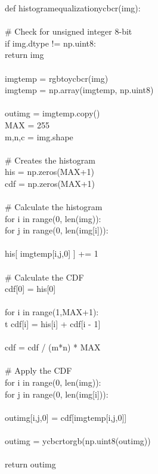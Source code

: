 \documentclass{article}
\begin{document}
	\noindent def histogram\textunderscore equalization\textunderscore ycbcr(img):\\
	\\
	\indent \# Check for unsigned integer 8-bit\\
	\indent if img.dtype != np.uint8:\\
	\indent \indent return img\\
	\\
	\indent img\textunderscore temp = rgb\textunderscore to\textunderscore ycbcr(img)\\
	\indent img\textunderscore temp = np.array(img\textunderscore temp, np.uint8)\\
	\\
	\indent out\textunderscore img = img\textunderscore temp.copy()\\
	\indent MAX = 255\\
	\indent m,n,c = img.shape\\
	\\
	\indent \# Creates the histogram\\
	\indent his = np.zeros(MAX+1)\\
	\indent cdf = np.zeros(MAX+1)\\
	\\
	\indent \# Calculate the histogram\\
	\indent for i in range(0, len(img)):\\
	\indent \indent for j in range(0, len(img[i])):\\
	\\
	\indent \indent \indent his[ img\textunderscore temp[i,j,0] ] += 1\\
	\\
	\indent \# Calculate the CDF    \\
	\indent cdf[0] = his[0]\\
	\\
	\indent for i in range(1,MAX+1):\\
	\indent \indent t cdf[i] = his[i] + cdf[i - 1]\\
	\\
	\indent cdf = cdf / (m*n) * MAX\\
	\\
	\indent \# Apply the CDF\\
	\indent for i in range(0, len(img)):\\
	\indent \indent for j in range(0, len(img[i])):\\
	\\
	\indent \indent \indent out\textunderscore img[i,j,0] = cdf[img\textunderscore temp[i,j,0]]\\
	\\
	\indent out\textunderscore img = ycbcr\textunderscore to\textunderscore rgb(np.uint8(out\textunderscore img))\\
	\\
	\indent return out\textunderscore img\\
	
\end{document}
